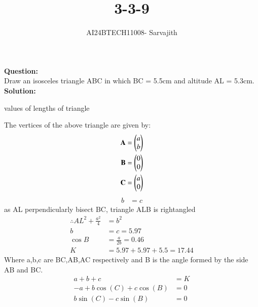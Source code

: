 \documentclass[journal]{IEEEtran}
\begin{document}

\vspace{3cm}

\title{3-3-9}
\author{AI24BTECH11008- Sarvajith
}
{\let\newpage\relax\maketitle}

\renewcommand{\thefigure}{\theenumi}
\renewcommand{\thetable}{\theenumi}
\setlength{\intextsep}{10pt} %
\renewcommand{\thetable}{\theenumi}
\textbf{Question: }\\
Draw an isosceles triangle ABC in which BC = 5.5cm and altitude AL = 5.3cm. \\
\textbf{Solution: }\\
\renewcommand{\tablename}{TABLE 1}
\begin{table}[h!]    
\centering
 
\caption{values of lengths of triangle}
 \label{tab1-1.2-18-1}
\end{table}
The vertices of the above triangle are given by:
\begin{align}
    \textbf{A} &= \begin{pmatrix}a\\b\end{pmatrix} \label{eq. 3-3-9.1}\\
    \textbf{B} &= \begin{pmatrix}0\\0\end{pmatrix}\label{eq. 3-3-9.2}\\
    \textbf{C} &= \begin{pmatrix}a\\0\end{pmatrix}\label{eq. 3-3-9.3}
\end{align}
\begin{align}
b &= c
\end{align}
as AL perpendicularly bisect BC, triangle ALB is rightangled \\
\begin{align}
\therefore AL^2 + \frac{a^2}{4} &= b^2\\
b&=c=5.97\\
\cos B &= \frac{a}{2b} = 0.46\\
K&= 5.97 + 5.97 + 5.5 = 17.44
\end{align}
Where a,b,c are BC,AB,AC respectively and B is the angle formed by the side AB and BC.\\
\begin{align*}
	a+b+c&=K\\
	-a+b\cos(C)+c\cos(B)&=0\\
	b\sin(C)-c\sin(B)&=0\\
\end{align*}
\end{document}
